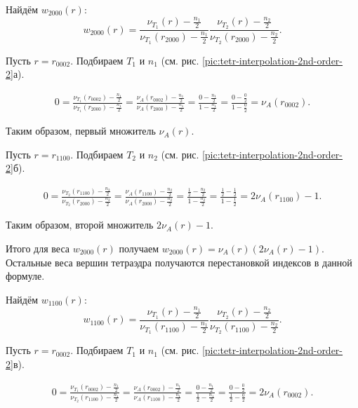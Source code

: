 Найдём $w_{2000}(r)$:
\begin{equation}
w_{2000}(r) = \frac{ \nu_{T_1}(r) - \frac{n_1}{2} }{ \nu_{T_1}(r_{2000}) - \frac{n_1}{2} } \frac{ \nu_{T_2}(r) - \frac{n_2}{2} }{ \nu_{T_2}(r_{2000}) - \frac{n_2}{2} }.
\end{equation}


Пусть $r = r_{0002}$. Подбираем $T_1$ и $n_1$ (см. рис. \ref{pic:tetr-interpolation-2nd-order-2}а).

\begin{align}
0 = \frac{ \nu_{T_1}(r_{0002}) - \frac{n_1}{2} }{ \nu_{T_1}(r_{2000}) - \frac{n_1}{2} } = \frac{ \nu_{A}(r_{0002}) - \frac{n_1}{2} }{ \nu_{A}(r_{2000}) - \frac{n_1}{2} } = \frac{ 0 - \frac{n_1}{2} }{ 1 - \frac{n_1}{2} } = \frac{ 0 - \frac{0}{2} }{ 1 - \frac{0}{2} } = \nu_{A}(r_{0002}).
\end{align}

Таким образом, первый множитель $\nu_{A}(r)$.

Пусть $r = r_{1100}$. Подбираем $T_2$ и $n_2$ (см. рис. \ref{pic:tetr-interpolation-2nd-order-2}б).

\begin{align}
0 = \frac{ \nu_{T_2}(r_{1100}) - \frac{n_2}{2} }{ \nu_{T_2}(r_{2000}) - \frac{n_2}{2} } = \frac{ \nu_{A}(r_{1100}) - \frac{n_2}{2} }{ \nu_{A}(r_{2000}) - \frac{n_2}{2} } = \frac{ \frac{1}{2} - \frac{n_2}{2} }{ 1 - \frac{n_2}{2} } = \frac{ \frac{1}{2} - \frac{1}{2} }{ 1 - \frac{1}{2} } = 2\nu_{A}(r_{1100}) - 1.
\end{align}

Таким образом, второй множитель $2\nu_{A}(r)-1$.

Итого для веса $w_{2000}(r)$ получаем $w_{2000}(r) = \nu_{A}(r) (2\nu_{A}(r)-1)$. Остальные веса вершин тетраэдра получаются перестановкой индексов в данной формуле.

Найдём $w_{1100}(r)$:
\begin{equation}
w_{1100}(r) = \frac{ \nu_{T_1}(r) - \frac{n_1}{2} }{ \nu_{T_1}(r_{1100}) - \frac{n_1}{2} } \frac{ \nu_{T_2}(r) - \frac{n_2}{2} }{ \nu_{T_2}(r_{1100}) - \frac{n_2}{2} }.
\end{equation}

Пусть $r = r_{0002}$. Подбираем $T_1$ и $n_1$ (см. рис. \ref{pic:tetr-interpolation-2nd-order-2}в).

\begin{align}
0 = \frac{ \nu_{T_1}(r_{0002}) - \frac{n_1}{2} }{ \nu_{T_2}(r_{1100}) - \frac{n_1}{2} } = \frac{ \nu_{A}(r_{0002}) - \frac{n_1}{2} }{ \nu_{A}(r_{1100}) - \frac{n_1}{2} } = \frac{ 0 - \frac{n_1}{2} }{ \frac{1}{2} - \frac{n_1}{2} } = \frac{ 0 - \frac{0}{2} }{ \frac{1}{2} - \frac{0}{2} } = 2\nu_{A}(r_{0002}).
\end{align}

